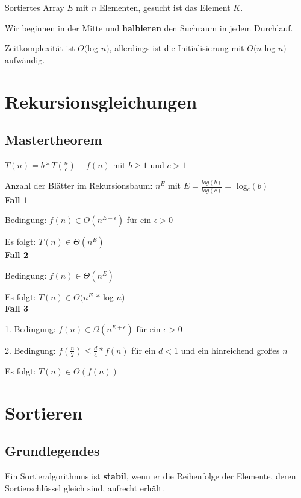 \documentclass[12pt]{article}
\begin{document}
Sortiertes Array $E$ mit $n$ Elementen, gesucht ist das Element $K$.

Wir beginnen in der Mitte und \textbf{halbieren} den Suchraum in jedem Durchlauf.

Zeitkomplexität ist $O($log $n)$, allerdings ist die Initialisierung mit $O(n $ log $ n)$ aufwändig.

\section{Rekursionsgleichungen}

\subsection{Mastertheorem}

$T(n) = b * T(\frac{n}{c}) + f(n)$ mit $b \geq 1$ und $c > 1$

Anzahl der Blätter im Rekursionsbaum: $n^E$ mit $E = \frac{log(b)}{log(c)} = $ log$_c(b)$\\

\textbf{Fall 1}

Bedingung: $f(n) \in O(n^{E-\epsilon})$ für ein $\epsilon > 0$

Es folgt: $T(n) \in \Theta(n^E)$\\

\textbf{Fall 2}

Bedingung: $f(n) \in \Theta(n^{E})$

Es folgt: $T(n) \in \Theta(n^E$ $*$ log $n)$\\

\textbf{Fall 3}

1. Bedingung: $f(n) \in \Omega(n^{E+\epsilon})$ für ein $\epsilon > 0$

2. Bedingung: $f(\frac{n}{2}) \leq \frac{d}{4} * f(n)$ für ein $d < 1$ und ein hinreichend großes $n$

Es folgt: $T(n) \in \Theta(f(n))$

\section{Sortieren}

\subsection{Grundlegendes}

Ein Sortieralgorithmus ist \textbf{stabil}, wenn er die Reihenfolge der Elemente, deren Sortierschlüssel gleich sind, aufrecht erhält.
\end{document}
